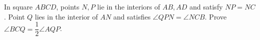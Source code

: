 In square $ABCD$, points $N,P$ lie in the interiors of $AB,AD$ and satisfy $NP=NC$. Point $Q$ lies in the interior of $AN$ and satisfies $\angle QPN=\angle NCB$. Prove $\angle BCQ=\dfrac{1}{2}\angle AQP$.
